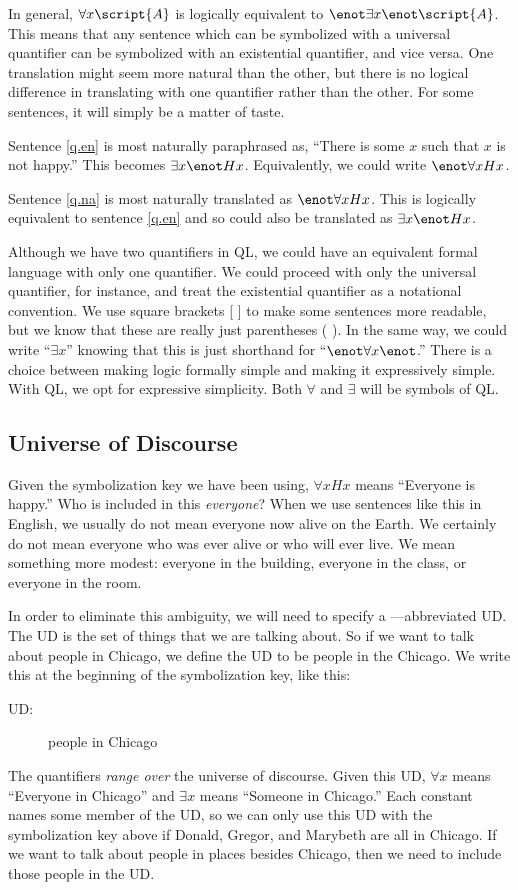 In general, $\forall x\script{A}$ is logically equivalent to $\enot\exists x\enot\script{A}$. This means that any sentence which can be symbolized with a universal quantifier can be symbolized with an existential quantifier, and vice versa. One translation might seem more natural than the other, but there is no logical difference in translating with one quantifier rather than the other. For some sentences, it will simply be a matter of taste.

Sentence \ref{q.en} is most naturally paraphrased as, ``There is some $x$ such that $x$ is not happy.'' This becomes $\exists x \enot Hx$. Equivalently, we could write $\enot\forall x Hx$.

Sentence \ref{q.na} is most naturally translated as $\enot\forall xHx$. This is logically equivalent to sentence \ref{q.en} and so could also be translated as $\exists x \enot Hx$.

Although we have two quantifiers in QL, we could have an equivalent formal language with only one quantifier. We could proceed with only the universal quantifier, for instance, and treat the existential quantifier as a notational convention. We use square brackets [ ] to make some sentences more readable, but we know that these are really just parentheses ( ). In the same way, we could write ``$\exists x$'' knowing that this is just shorthand for ``$\enot \forall x \enot$.'' There is a choice between making logic formally simple and making it expressively simple. With QL, we opt for expressive simplicity. Both $\forall$ and $\exists$ will be symbols of QL.


\subsection{Universe of Discourse}

Given the symbolization key we have been using, $\forall xHx$ means ``Everyone is happy.'' Who is included in this \emph{everyone}? When we use sentences like this in English, we usually do not mean everyone now alive on the Earth. We certainly do not mean everyone who was ever alive or who will ever live. We mean something more modest: everyone in the building, everyone in the class, or everyone in the room.

In order to eliminate this ambiguity, we will need to specify a ---abbreviated UD. The UD is the set of things that we are talking about. So if we want to talk about people in Chicago, we define the UD to be people in the Chicago. We write this at the beginning of the symbolization key, like this:
\begin{description}
\item[UD:] people in Chicago
\end{description}
The quantifiers \emph{range over} the universe of discourse. Given this UD, $\forall x$ means ``Everyone in Chicago'' and $\exists x$ means ``Someone in Chicago.'' Each constant names some member of the UD, so we can only use this UD with the symbolization key above if Donald, Gregor, and Marybeth are all in Chicago. If we want to talk about people in places besides Chicago, then we need to include those people in the UD.

